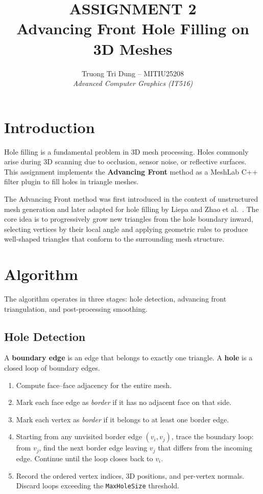 \documentclass[12pt,a4paper]{article}
\title{
  \textbf{ASSIGNMENT 2} \\[0.5em]
  \Large Advancing Front Hole Filling on 3D Meshes
}
\author{
  Truong Tri Dung -- MITIU25208 \\
  \textit{Advanced Computer Graphics (IT516)}
}
\date{}
\begin{document}
\maketitle

\section{Introduction}

Hole filling is a fundamental problem in 3D mesh processing. Holes commonly arise during 3D scanning due to occlusion, sensor noise, or reflective surfaces. This assignment implements the \textbf{Advancing Front} method as a MeshLab C++ filter plugin to fill holes in triangle meshes.

The Advancing Front method was first introduced in the context of unstructured mesh generation \cite{lo1985} and later adapted for hole filling by Liepa \cite{liepa2003} and Zhao et al.\ \cite{zhao2007}. The core idea is to progressively grow new triangles from the hole boundary inward, selecting vertices by their local angle and applying geometric rules to produce well-shaped triangles that conform to the surrounding mesh structure.

\section{Algorithm}

The algorithm operates in three stages: hole detection, advancing front triangulation, and post-processing smoothing.

\subsection{Hole Detection}

A \textbf{boundary edge} is an edge that belongs to exactly one triangle. A \textbf{hole} is a closed loop of boundary edges.

\begin{enumerate}[leftmargin=2em]
  \item Compute face--face adjacency for the entire mesh.
  \item Mark each face edge as \emph{border} if it has no adjacent face on that side.
  \item Mark each vertex as \emph{border} if it belongs to at least one border edge.
  \item Starting from any unvisited border edge $(v_i, v_j)$, trace the boundary loop: from $v_j$, find the next border edge leaving $v_j$ that differs from the incoming edge. Continue until the loop closes back to $v_i$.
  \item Record the ordered vertex indices, 3D positions, and per-vertex normals. Discard loops exceeding the \texttt{MaxHoleSize} threshold.
\end{enumerate}
\end{document}
